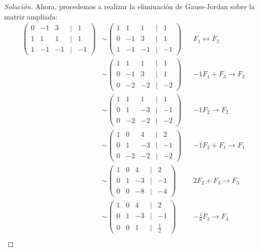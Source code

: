 \documentclass[a4,11pt]{aleph-notas}
\begin{document}
\begin{proof}[Solución]
    Ahora, procedemos a realizar la eliminación de Gauss-Jordan sobre la matriz ampliada:
    \begin{align*}
        \begin{pmatrix}
            0&-1&3&|&1\\
            1&1&1&|&1\\
            1&-1&-1&|&-1
        \end{pmatrix}
        & \sim 
        \begin{pmatrix}
            1&1&1&|&1\\
            0&-1&3&|&1\\
            1&-1&-1&|&-1
        \end{pmatrix}
        && F_1\leftrightarrow F_2\\
        & \sim 
        \begin{pmatrix}
            1&1&1&|&1\\
            0&-1&3&|&1\\
            0&-2&-2&|&-2
        \end{pmatrix}
        && -1F_1+F_3\to F_3\\
        & \sim 
        \begin{pmatrix}
            1&1&1&|&1\\
            0&1&-3&|&-1\\
            0&-2&-2&|&-2
        \end{pmatrix}
        && -1F_2 \to F_2\\
        & \sim 
        \begin{pmatrix}
            1&0&4&|&2\\
            0&1&-3&|&-1\\
            0&-2&-2&|&-2
        \end{pmatrix}
        && -1F_2+F_1\to F_1\\
        & \sim 
        \begin{pmatrix}
            1&0&4&|&2\\
            0&1&-3&|&-1\\
            0&0&-8&|&-4
        \end{pmatrix}
        && 2F_2+F_3\to F_3\\
        & \sim 
        \begin{pmatrix}
            1&0&4&|&2\\
            0&1&-3&|&-1\\
            0&0&1&|&\frac 1 2
        \end{pmatrix}
        && -\frac 1 8F_3 \to F_3\\

\end{align*}
\end{proof}
\end{document}
